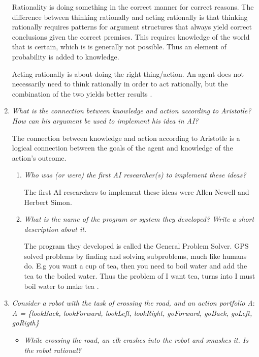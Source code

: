 \begin{enumerate}
    Rationality is doing something in the correct manner for correct reasons. The difference between thinking rationally and acting rationally is that thinking rationally requires patterns for argument structures that always yield correct conclusions given the correct premises. This requires knowledge of the world that is certain, which is is generally not possible. Thus an element of probability is added to knowledge. 

    Acting rationally is about doing the right thing/action. An agent does not necessarily need to think rationally in order to act rationally, but the combination of the two yields better results \cite{aima}.\\ 

    \item \textit{What is the connection between knowledge and action according to Aristotle? How can his argument be used to implement his idea in AI?}

    The connection between knowledge and action according to Aristotle is a logical connection between the goals of the agent and knowledge of the action's outcome. 
        \begin{enumerate}
            \item \textit{Who was (or were) the first AI researcher(s) to implement these ideas?} 
            
            The first AI researchers to implement these ideas were Allen Newell and Herbert Simon. 
            \item \textit{What is the name of the program or system they developed? Write a short description about it.}
            
            The program they developed is called the General Problem Solver. GPS solved problems by finding and solving subproblems, much like humans do. E.g you want a cup of tea, then you need to boil water and add the tea to the boiled water. Thus the problem of I want tea, turns into I must boil water to make tea \cite{aima}.
        \end{enumerate}

\newpage

    \item \textit{Consider a robot with the task of crossing the road, and an action portfolio A}: \\

        \textit{A = \{lookBack, lookForward, lookLeft, lookRight, goForward, goBack, goLeft, goRigth\}}

        \begin{itemize}
            \item \textit{While crossing the road, an elk crashes into the robot and smashes it. Is the robot rational?}
            

\end{itemize}
\end{enumerate}
